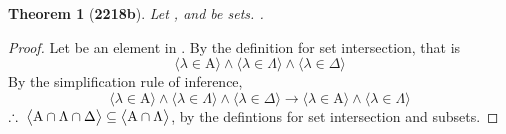 \documentclass[preview]{standalone}
\newtheorem*{theorem*}{Theorem}
\begin{document}
\begin{theorem*}[\textbf{2218b}] \color{black}
    Let , \bm{$\Lambda$} and \bm{$\Delta$} be sets. 
    .
\end{theorem*}
\begin{proof} \color{black}
    Let \bm{$\lambda$} be an element in . 
    By the definition for set intersection, that is
    \begin{equation*}
        \Big \langle \lambda \in \mathrm{A} \Big \rangle
            \land 
        \Big \langle \lambda \in \Lambda \Big \rangle
            \land 
        \Big \langle \lambda \in \Delta \Big \rangle
    \end{equation*} 
    By the simplification rule of inference,
    \begin{equation*}
        \Big \langle \lambda \in \mathrm{A} \Big \rangle
            \land 
        \Big \langle \lambda \in \Lambda \Big \rangle
            \land 
        \Big \langle \lambda \in \Delta \Big \rangle
            \rightarrow
        \Big \langle \lambda \in \mathrm{A} \Big \rangle
            \land 
        \Big \langle \lambda \in \Lambda \Big \rangle
    \end{equation*} 
    $\therefore \text{\space} \relax{
    \big \langle \mathrm{A} \cap \Lambda \cap \Delta \big \rangle
        \subseteq 
    \big \langle \mathrm{A} \cap \Lambda \big \rangle
    }$,
    by the defintions for set intersection and subsets.
\color{lightgray} \end{proof}
\end{document}
